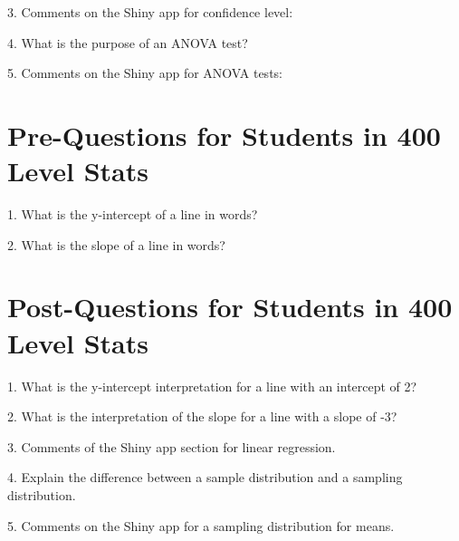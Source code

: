 \documentclass[11pt]{amsart}
\begin{document}
3. Comments on the Shiny app for confidence level:


4. What is the purpose of an ANOVA test?


5. Comments on the Shiny app for ANOVA tests:




\section{Pre-Questions for Students in 400 Level Stats}

1. What is the y-intercept of a line in words?

2. What is the slope of a line in words?


\section{Post-Questions for Students in 400 Level Stats}

1.  What is the y-intercept interpretation for a line with an intercept of 2?

2. What is the interpretation of the slope for a line with a slope of -3?

3. Comments of the Shiny app section for linear regression.


4. Explain the difference between a sample distribution and a sampling distribution.


5. Comments on the Shiny app for a sampling distribution for means.
\end{document}
